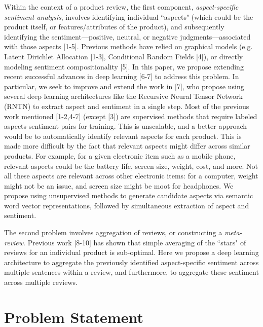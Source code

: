 \documentclass{article} %
\begin{document}
Within the context of a product review, the first component, \textit{aspect-specific sentiment analysis}, involves identifying individual ``aspects" (which could be the product itself, or features/attributes of the product), and subsequently identifying the sentiment---positive, neutral, or negative judgments---associated with those aspects [1-5]. Previous methods have relied on graphical models (e.g. Latent Dirichlet Allocation [1-3], Conditional Random Fields [4]), or directly modeling sentiment compositionality [5]. In this paper, we propose extending recent successful advances in deep learning [6-7] to address this problem. In particular, we seek to improve and extend the work in [7], who propose using several deep learning architectures like the Recursive Neural Tensor Network (RNTN) to extract aspect and sentiment in a single step. Most of the previous work mentioned [1-2,4-7] (except [3]) are supervised methods that require labeled aspects-sentiment pairs for training. This is unscalable, and a better approach would be to automatically identify relevant aspects for each product. This is made more difficult by the fact that relevant aspects might differ across similar products. For example, for a given electronic item such as a mobile phone, relevant aspects could be the battery life, screen size, weight, cost, and more. Not all these aspects are relevant across other electronic items: for a computer, weight might not be an issue, and screen size might be moot for headphones. We propose using unsupervised methods to generate candidate aspects via semantic word vector representations, followed by simultaneous extraction of aspect and sentiment.

The second problem involves aggregation of reviews, or constructing a \textit{meta-review}. Previous work [8-10] has shown that simple averaging of the ``stars" of reviews for an individual product is sub-optimal. Here we propose a deep learning architecture to aggregate the previously identified aspect-specific sentiment across multiple sentences within a review, and furthermore, to aggregate these sentiment across multiple reviews.










\section{Problem Statement}
\end{document}
